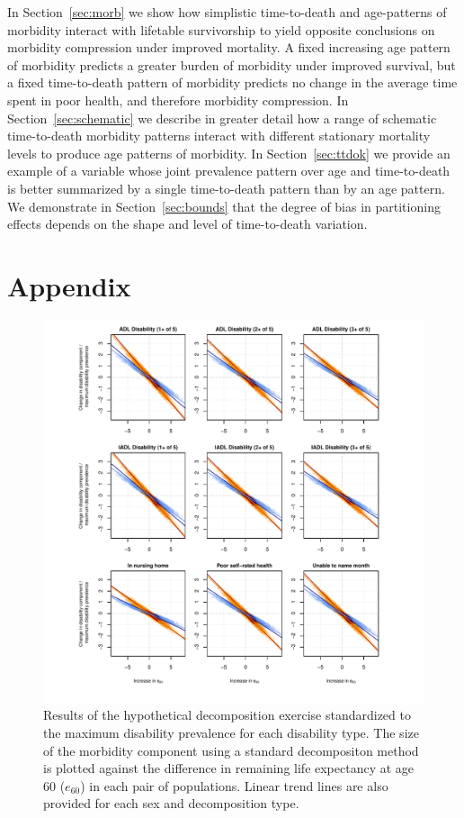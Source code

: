 \documentclass[11pt,oneside,a4paper]{article} %
\begin{document}
In Section~\ref{sec:morb} we show how simplistic time-to-death and age-patterns of morbidity interact with lifetable survivorship to yield opposite conclusions on morbidity compression under improved mortality. A fixed increasing age pattern of morbidity predicts a greater burden of morbidity under improved survival, but a fixed time-to-death pattern of morbidity predicts no change in the average time spent in poor health, and therefore morbidity compression. In Section~\ref{sec:schematic} we describe in greater detail how a range of schematic time-to-death morbidity patterns interact with different stationary mortality levels to produce age patterns of morbidity. In Section~\ref{sec:ttdok} we provide an example of a variable whose joint prevalence pattern over age and time-to-death is better summarized by a single time-to-death pattern than by an age pattern. We demonstrate in Section~\ref{sec:bounds} that the degree of bias in partitioning effects depends on the shape and level of time-to-death variation. 

\section{Appendix}

\begin{figure}
\begin{adjustwidth}{-1.5cm}{}
	\centering
	\includegraphics[scale=.8]{Figures/Decomp_3x3_rel.pdf}
	\caption{Results of the hypothetical decomposition exercise standardized to the maximum disability prevalence for each disability type. The size of the
	morbidity component using a standard decompositon method is plotted against
	the difference in remaining life expectancy at age 60 ($e_{60}$) in each
	pair of populations. Linear trend lines are also provided for each sex and decomposition type.}
	\label{fig:Fig_Decomp_3x3_rel}
\end{adjustwidth}
\end{figure}


\newpage%


\end{document}
